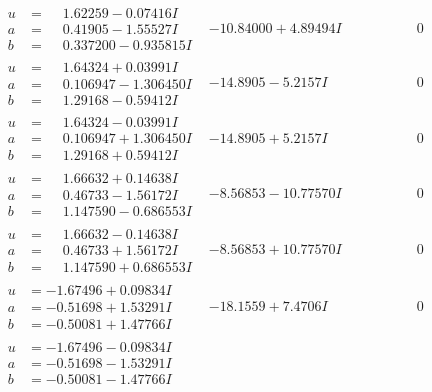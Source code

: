 \documentclass[1p]{elsarticle_modified}
\theoremstyle{definition}
\begin{document}
$$\begin{array}{c|c|c}
\begin{aligned}
u &= \phantom{-}1.62259 - 0.07416 I \\
a &= \phantom{-}0.41905 - 1.55527 I \\
b &= \phantom{-}0.337200 - 0.935815 I\end{aligned}
 & -10.84000 + 4.89494 I & \phantom{-0.000000 } 0 \\ \hline\begin{aligned}
u &= \phantom{-}1.64324 + 0.03991 I \\
a &= \phantom{-}0.106947 - 1.306450 I \\
b &= \phantom{-}1.29168 - 0.59412 I\end{aligned}
 & -14.8905 - 5.2157 I & \phantom{-0.000000 } 0 \\ \hline\begin{aligned}
u &= \phantom{-}1.64324 - 0.03991 I \\
a &= \phantom{-}0.106947 + 1.306450 I \\
b &= \phantom{-}1.29168 + 0.59412 I\end{aligned}
 & -14.8905 + 5.2157 I & \phantom{-0.000000 } 0 \\ \hline\begin{aligned}
u &= \phantom{-}1.66632 + 0.14638 I \\
a &= \phantom{-}0.46733 - 1.56172 I \\
b &= \phantom{-}1.147590 - 0.686553 I\end{aligned}
 & -8.56853 - 10.77570 I & \phantom{-0.000000 } 0 \\ \hline\begin{aligned}
u &= \phantom{-}1.66632 - 0.14638 I \\
a &= \phantom{-}0.46733 + 1.56172 I \\
b &= \phantom{-}1.147590 + 0.686553 I\end{aligned}
 & -8.56853 + 10.77570 I & \phantom{-0.000000 } 0 \\ \hline\begin{aligned}
u &= -1.67496 + 0.09834 I \\
a &= -0.51698 + 1.53291 I \\
b &= -0.50081 + 1.47766 I\end{aligned}
 & -18.1559 + 7.4706 I & \phantom{-0.000000 } 0 \\ \hline\begin{aligned}
u &= -1.67496 - 0.09834 I \\
a &= -0.51698 - 1.53291 I \\
b &= -0.50081 - 1.47766 I\end{aligned}

\end{array}$$
\end{document}
